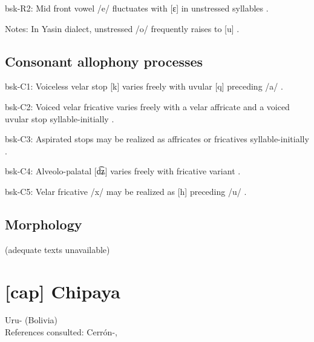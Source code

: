{\begin{appendixdesc}
\item[bsk-R2:] Mid front vowel /e/ fluctuates with [ɛ] in unstressed syllables \citep[1029]{Anderson1997}.

\item[Notes:] In Yasin dialect, unstressed /o/ frequently raises to [u] \citep[1038]{Anderson1997}.
\end{appendixdesc}
\subsection*{Consonant allophony processes}
\begin{appendixdesc}

\item[bsk-C1:] Voiceless velar stop [k] varies freely with uvular [q] preceding /a/ \citep[1025]{Anderson1997}.

\item[bsk-C2:] Voiced velar fricative varies freely with a velar affricate and a voiced uvular stop syllable-initially \citep[1025]{Anderson1997}.

\item[bsk-C3:] Aspirated stops may be realized as affricates or fricatives syllable-initially \citep[1025]{Anderson1997}.

\item[bsk-C4:] Alveolo-palatal [d͡ʑ] varies freely with fricative variant \citep[1025]{Anderson1997}.

\item[bsk-C5:] Velar fricative /x/ may be realized as [h] preceding /u/ \citep[1025]{Anderson1997}.
\end{appendixdesc}
\subsection*{Morphology}


(adequate texts unavailable)
\section*{[cap] Chipaya} %
Uru- (Bolivia)\medskip\\
References consulted: Cerrón-\citet{Palomino2006}, \citet{Olson1967}

}
